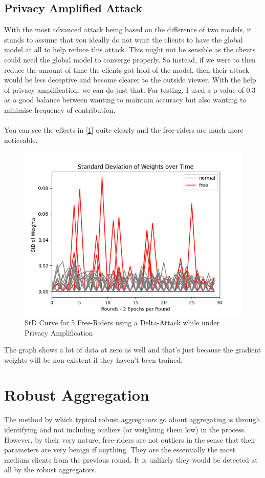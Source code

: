 \subsection{Privacy Amplified Attack}
With the most advanced attack being based on the difference of two models, it stands to assume that you ideally do not want the clients to have the global model at all to help reduce this attack.
This might not be sensible as the clients could need the global model to converge properly.
So instead, if we were to then reduce the amount of time the clients got hold of the model, then their attack would be less deceptive and become clearer to the outside viewer.
With the help of privacy amplification, we can do just that.
For testing, I used a p-value of 0.3 as a good balance between wanting to maintain accuracy but also wanting to minimise frequency of contribution.
\\ \\
You can see the effects in [\ref{fig:std_priv}] quite clearly and the free-riders are much more noticeable.
\begin{figure}[htbp]
	\centering
    \includegraphics[scale=0.5]{free_riders/graphs/priv5.png}
	\caption{StD Curve for 5 Free-Riders using a Delta-Attack while under Privacy Amplification}
	\label{fig:std_priv}
\end{figure}

The graph shows a lot of data at zero as well and that's just because the gradient weights will be non-existent if they haven't been trained.


\section{Robust Aggregation}
The method by which typical robust aggregators go about aggregating is through identifying and not including outliers (or weighting them low) in the process.
However, by their very nature, free-riders are not outliers in the sense that their parameters are very benign if anything.
They are the essentially the most medium clients from the previous round. 
It is unlikely they would be detected at all by the robust aggregators.

